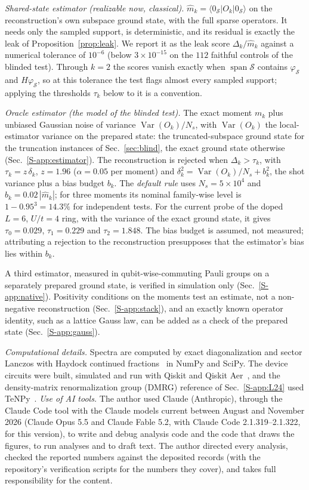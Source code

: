 \documentclass[aps,prb,reprint,onecolumn,12pt,superscriptaddress,longbibliography,floatfix]{revtex4-2}
\begin{document}
\emph{Shared-state estimator (realizable now, classical).} $\widehat m_k=\langle 0_\mathcal S|O_k|0_\mathcal S\rangle$ on the reconstruction's own subspace ground state, with the full sparse operators. It needs only the sampled support, is deterministic, and its residual is exactly the leak of Proposition~\ref{prop:leak}. We report it as the leak score $\Delta_k/\widehat m_k$ against a numerical tolerance of $10^{-6}$ (below $3\times10^{-15}$ on the $112$ faithful controls of the blinded test). Through $k=2$ the scores vanish exactly when $\operatorname{span}\mathcal S$ contains $\varphi_\mathcal S$ and $H\varphi_\mathcal S$, so at this tolerance the test flags almost every sampled support; applying the thresholds $\tau_k$ below to it is a convention.

\emph{Oracle estimator (the model of the blinded test).} The exact moment $m_k$ plus unbiased Gaussian noise of variance $\operatorname{Var}(O_k)/N_s$, with $\operatorname{Var}(O_k)$ the local-estimator variance on the prepared state: the truncated-subspace ground state for the truncation instances of Sec.~\ref{sec:blind}, the exact ground state otherwise (Sec.~\ref{S-app:estimator}). The reconstruction is rejected when $\Delta_k>\tau_k$, with $\tau_k=z\,\delta_k$, $z=1.96$ ($\alpha=0.05$ per moment) and $\delta_k^2=\operatorname{Var}(O_k)/N_s+b_k^2$, the shot variance plus a bias budget $b_k$. The \emph{default rule} uses $N_s=5\times10^4$ and $b_k=0.02\,|\widehat m_k|$; for three moments its nominal family-wise level is $1-0.95^3=14.3\%$ for independent tests. For the current probe of the doped $L=6$, $U/t=4$ ring, with the variance of the exact ground state, it gives $\tau_0=0.029$, $\tau_1=0.229$ and $\tau_2=1.848$. The bias budget is assumed, not measured; attributing a rejection to the reconstruction presupposes that the estimator's bias lies within $b_k$.

A third estimator, measured in qubit-wise-commuting Pauli groups on a separately prepared ground state, is verified in simulation only (Sec.~\ref{S-app:native}). Positivity conditions on the moments test an estimate, not a non-negative reconstruction (Sec.~\ref{S-app:stack}), and an exactly known operator identity, such as a lattice Gauss law, can be added as a check of the prepared state (Sec.~\ref{S-app:gauss}).

\emph{Computational details.} Spectra are computed by exact diagonalization and sector Lanczos with Haydock continued fractions~\cite{Haydock1972,Lanczos1950} in NumPy and SciPy. The device circuits were built, simulated and run with Qiskit and Qiskit Aer~\cite{Qiskit2024}, and the density-matrix renormalization group (DMRG) reference of Sec.~\ref{S-app:L24} used TeNPy~\cite{TeNPy2024}. \emph{Use of AI tools.} The author used Claude (Anthropic), through the Claude Code tool with the Claude models current between August and November 2026 (Claude Opus 5.5 and Claude Fable 5.2, with Claude Code 2.1.319--2.1.322, for this version), to write and debug analysis code and the code that draws the figures, to run analyses and to draft text. The author directed every analysis, checked the reported numbers against the deposited records (with the repository's verification scripts for the numbers they cover), and takes full responsibility for the content.
\end{document}
